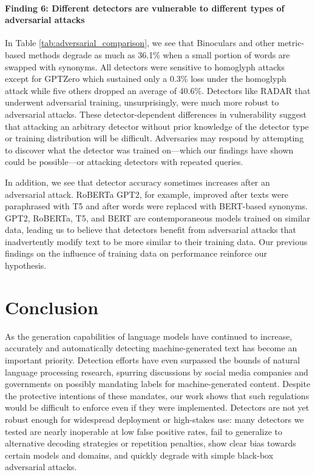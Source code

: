 \documentclass[11pt]{article}
\begin{document}
\paragraph{Finding 6: Different detectors are vulnerable to different types of adversarial attacks}
In Table \ref{tab:adversarial_comparison}, we see that Binoculars and other metric-based methods degrade as much as 36.1\% when a small portion of words are swapped with synonyms. All detectors were sensitive to homoglyph attacks except for GPTZero which sustained only a 0.3\% loss under the homoglyph attack while five others dropped an average of 40.6\%. Detectors like RADAR that underwent adversarial training, unsurprisingly, were much more robust to adversarial attacks. 
These detector-dependent differences in vulnerability suggest that attacking an arbitrary detector without prior knowledge of the detector type or training distribution will be difficult. Adversaries may respond by attempting to discover what the detector was trained on---which our findings have shown could be possible---or attacking detectors with repeated queries.

In addition, we see that detector accuracy sometimes increases after an adversarial attack. RoBERTa GPT2, for example, improved after texts were paraphrased with T5 and after words were replaced with BERT-based synonyms. GPT2, RoBERTa, T5, and BERT are contemporaneous models trained on similar data, leading us to believe that detectors benefit from adversarial attacks that inadvertently modify text to be more similar to their training data. Our previous findings on the influence of training data on performance reinforce our hypothesis.

\section{Conclusion}
As the generation capabilities of language models have continued to increase, accurately and automatically detecting machine-generated text has become an important priority. Detection efforts have even surpassed the bounds of natural language processing research, spurring discussions by social media companies and governments on possibly mandating labels for machine-generated content. Despite the protective intentions of these mandates, our work shows that such regulations would be difficult to enforce even if they were implemented. Detectors are not yet robust enough for widespread deployment or high-stakes use: many detectors we tested are nearly inoperable at low false positive rates, fail to generalize to alternative decoding strategies or repetition penalties, show clear bias towards certain models and domains, and quickly degrade with simple black-box adversarial attacks.
\end{document}
